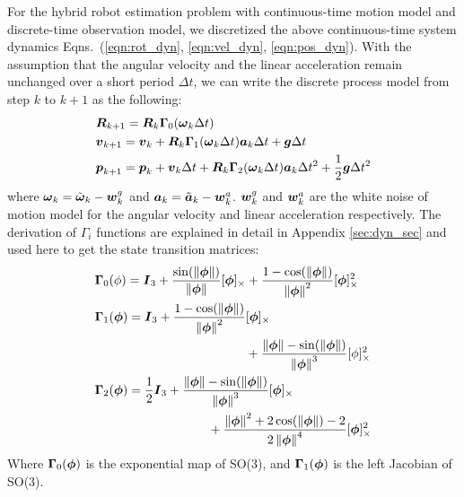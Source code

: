 For the hybrid robot estimation problem with continuous-time motion model and discrete-time observation model, we discretized the above continuous-time system dynamics Eqns.~(\ref{eqn:rot_dyn}, \ref{eqn:vel_dyn}, \ref{eqn:pos_dyn}). With the assumption that the angular velocity and the linear acceleration remain unchanged over a short period $\Delta t$, we can write the discrete process model from step $k$ to $k+1$ as the following:
\begin{align}
    & \boldsymbol{R}_{k+1} = \boldsymbol{R}_k \boldsymbol{\Gamma}_0 (\boldsymbol{\omega}_k \Delta t) \\
    & \boldsymbol{v}_{k+1} = \boldsymbol{v}_k + \boldsymbol{R}_k \boldsymbol{\Gamma}_1 (\boldsymbol{\omega}_k \Delta t) \boldsymbol{a}_k \Delta t + \boldsymbol{g} \Delta t \\
    & \boldsymbol{p}_{k+1} = \boldsymbol{p}_k + \boldsymbol{v}_k \Delta t + \boldsymbol{R}_k \boldsymbol{\Gamma}_2 (\boldsymbol{\omega}_k \Delta t) \boldsymbol{a}_k \Delta t^2 + \frac{1}{2}\boldsymbol{g} \Delta t^2
\end{align}
where $\boldsymbol{\omega}_k = \tilde{\boldsymbol{\omega}}_k-\boldsymbol{w}^g_k$ and $\boldsymbol{a}_k = \tilde{\boldsymbol{a}}_k-\boldsymbol{w}^a_k$. $\boldsymbol{w}^g_k$ and $\boldsymbol{w}^a_k$ are the white noise of motion model for the angular velocity and linear acceleration respectively. The derivation of $\Gamma_i$ functions are explained in detail in Appendix \ref{sec:dyn_sec} and used here to get the state transition matrices:
\begin{align}
    & \boldsymbol{\Gamma}_0(\phi) = \boldsymbol{I}_3 + \frac{\sin(\left\lVert\boldsymbol{\phi}\right\rVert)}{\left\lVert\boldsymbol{\phi}\right\rVert}[\boldsymbol{\phi}]_\times 
    + \frac{1-\cos(\left\lVert\boldsymbol{\phi}\right\rVert)}{\left\lVert\boldsymbol{\phi}\right\rVert^2}[\boldsymbol{\phi}]^2_\times \\
    & \boldsymbol{\Gamma}_1(\boldsymbol{\phi}) = \boldsymbol{I}_3 + \frac{1-\cos(\left\lVert\boldsymbol{\phi}\right\rVert)}{\left\lVert\boldsymbol{\phi}\right\rVert^2}[\boldsymbol{\phi}]_\times\nonumber\\
    & \quad\quad\quad\quad\quad\quad\quad\quad\quad\quad\quad\quad
    + \frac{\left\lVert\boldsymbol{\phi}\right\rVert-\sin(\left\lVert\boldsymbol{\phi}\right\rVert)}{\left\lVert\boldsymbol{\phi}\right\rVert^3}[\phi]^2_\times \\
    & \boldsymbol{\Gamma}_2(\boldsymbol{\phi}) = \frac{1}{2}\boldsymbol{I}_3 + \frac{\left\lVert\boldsymbol{\phi}\right\rVert-\sin(\left\lVert\boldsymbol{\phi}\right\rVert)}{\left\lVert\boldsymbol{\phi}\right\rVert^3}[\boldsymbol{\phi}]_\times\nonumber\\
    & \quad\quad\quad\quad\quad\quad\quad\quad\quad +\frac{\left\lVert\boldsymbol{\phi}\right\rVert^2+2\cos(\left\lVert\boldsymbol{\phi}\right\rVert)-2}{2\left\lVert\boldsymbol{\phi}\right\rVert^4}[\boldsymbol{\phi}]^2_\times
\end{align}
Where $\boldsymbol{\Gamma}_0(\boldsymbol{\phi})$ is the exponential map of SO(3), and $\boldsymbol{\Gamma}_1(\boldsymbol{\phi})$ is the left Jacobian of SO(3).

